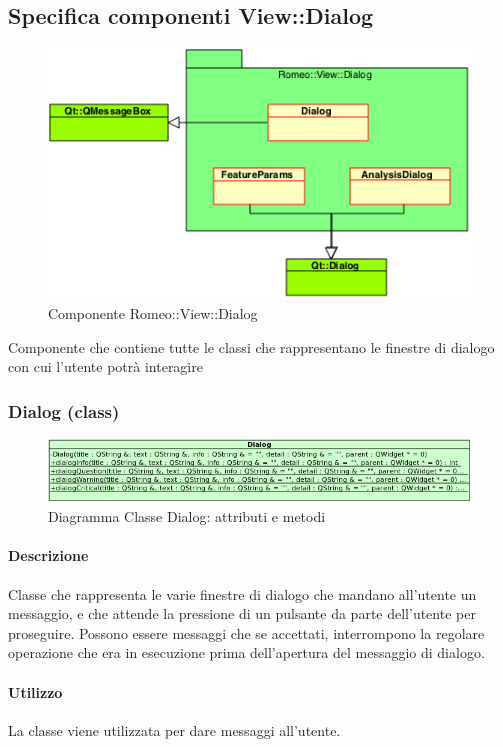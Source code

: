 \color{black}
\subsection{Specifica componenti View::Dialog}
\label{specificaDialog}
\begin{figure}[!h]

			\includegraphics[width=0.7\linewidth]{../Specifica_Tecnica/Content/Immagini/Romeo__View__Dialog.png}
			\caption{Componente Romeo::View::Dialog}
			\label{comp_romeo::view::dialog}
\end{figure}
Componente che contiene tutte le classi che rappresentano le finestre di dialogo con cui l'utente potrà interagire
\pagebreak
\subsubsection{Dialog (class)}
\label{spedialog}
\begin{figure}[!h]
\centering
			\includegraphics[width=1.1\linewidth]{./Content/Immagini/view/Dialog.png}
			\caption{Diagramma Classe Dialog: attributi e metodi}
			\label{cl_dia}
\end{figure}
\paragraph{Descrizione \\}
Classe che rappresenta le varie finestre di dialogo che mandano all'utente un messaggio, e che attende la pressione di un pulsante da parte dell'utente per proseguire. Possono essere messaggi che se accettati, interrompono la regolare operazione che era in esecuzione prima dell'apertura del messaggio di dialogo.
\paragraph{Utilizzo\\}
La classe viene utilizzata per dare messaggi all'utente.
